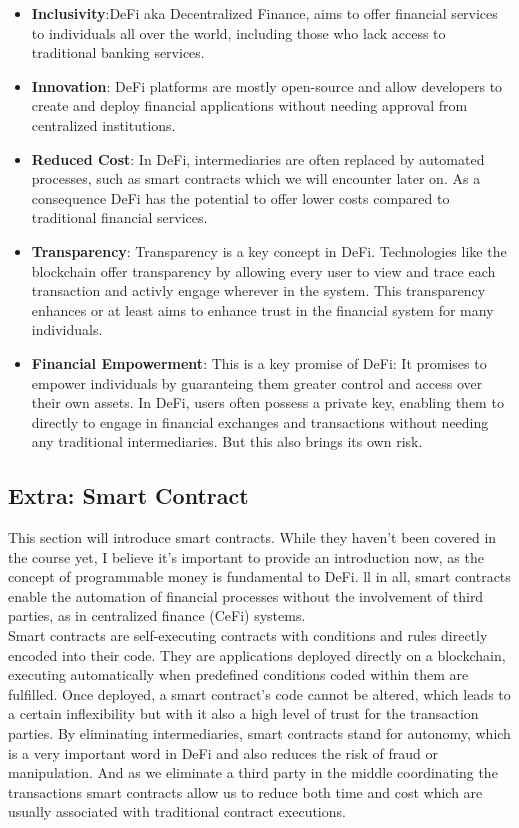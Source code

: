 \documentclass{article}
\begin{document}
\begin{itemize}
    \item \textbf{Inclusivity}:DeFi aka Decentralized Finance, aims to offer financial services to individuals all over the world, including those who lack access to traditional banking services.
    \item \textbf{Innovation}: DeFi platforms are mostly open-source and allow developers to create and deploy financial applications without needing approval from centralized institutions.
    \item \textbf{Reduced Cost}: In DeFi, intermediaries are often replaced by automated processes, such as smart contracts which we will encounter later on. As a consequence DeFi has the potential to offer lower costs compared to traditional financial services.
    \item \textbf{Transparency}: Transparency is a key concept in DeFi. Technologies like the blockchain offer transparency by allowing every user to view and trace each transaction and activly engage wherever in the system. This transparency enhances or at least aims to enhance trust in the financial system for many individuals.
    \item \textbf{Financial Empowerment}: This is a key promise of DeFi: It promises to empower individuals by guaranteing them greater control and access over their own assets. In DeFi, users often possess a private key, enabling them to directly to engage in financial exchanges and transactions without needing any traditional intermediaries. But this also brings its own risk.
\end{itemize}


\subsection{Extra: Smart Contract} 
This section will introduce smart contracts. While they haven't been covered in the course yet, I believe it's important to provide an introduction now, as the concept of programmable money is fundamental to DeFi. ll in all, smart contracts enable the automation of financial processes without the involvement of third parties, as in centralized finance (CeFi) systems.\\

Smart contracts are  self-executing contracts with conditions and rules directly encoded into their code. They are applications deployed directly on a blockchain, executing automatically when predefined conditions coded within them are fulfilled. Once deployed, a smart contract's code cannot be altered, which leads to a certain inflexibility but with it also a high level of trust for the transaction parties. By eliminating intermediaries, smart contracts stand for autonomy, which is a very important word in DeFi and also reduces  the risk of fraud or manipulation. And as we eliminate a third party in the middle coordinating the transactions smart contracts allow us to reduce both time and cost which are usually associated with traditional contract executions.
\end{document}
